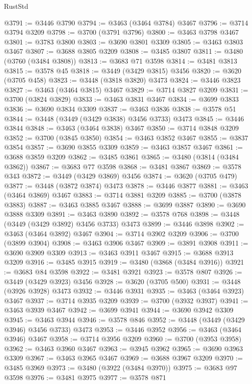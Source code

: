 \begin{lexlean}{RustStd}
\begin{coremodule}
{\begin{coremodule}
{{{{{{{{{{{{{{{{{{{{{{{{{{{{{{{{{{{{{{{{{{{{{{{{{{{{{{{{{{{{{{{{{{{{{{{{{{{{{{{{{{{{{@3791 := @3446 @3790
@3794 := @3463 (@3464 @3784) @3467
@3796 := @3714 @3794 @3209
@3798 := @3700 (@3791 @3796)
@3800 := @3463 @3798 @3467
@3801 := @3783 @3800
@3803 := @3690 @3801 @3309
@3805 := @3463 @3803 @3467
@3807 := @3688 @3805 @3209
@3808 := @3485 @3807
@3811 := @3480 (@3760 (@3484 @3808))
@3813 := @3683 @71 @3598
@3814 := @3481 @3813
@3815 := @3578 @45
@3818 := @3449 (@3429 @3815) @3456
@3820 := @3620 (@3705 @458)
@3823 := @3448 (@3818 @3820) @3473
@3824 := @3446 @3823
@3827 := @3463 (@3464 @3815) @3467
@3829 := @3714 @3827 @3209
@3831 := @3700 (@3824 @3829)
@3833 := @3463 @3831 @3467
@3834 := @3699 @3833
@3836 := @3690 @3834 @3309
@3837 := @3463 @3836
@3838 := @3578 @51
@3844 := @3448 (@3449 (@3429 @3838) @3456 @3733) @3473
@3845 := @3446 @3844
@3848 := @3463 (@3464 @3838) @3467
@3850 := @3714 @3848 @3209
@3852 := @3700 (@3845 @3850)
@3854 := @3463 @3852 @3467
@3855 := @3837 @3854
@3857 := @3690 @3855 @3309
@3859 := @3463 @3857 @3467
@3861 := @3688 @3859 @3209
@3862 := @3485 @3861
@3865 := @3480 (@3814 (@3484 @3862))
@3867 := @3683 @77 @3598
@3868 := @3481 @3867
@3869 := @3578 @343
@3872 := @3449 (@3429 @3869) @3456
@3874 := @3620 (@3705 @479)
@3877 := @3448 (@3872 @3874) @3473
@3878 := @3446 @3877
@3881 := @3463 (@3464 @3869) @3467
@3883 := @3714 @3881 @3209
@3885 := @3700 (@3878 @3883)
@3887 := @3463 @3885 @3467
@3888 := @3699 @3887
@3890 := @3690 @3888 @3309
@3891 := @3463 @3890
@3892 := @3578 @768
@3898 := @3448 (@3449 (@3429 @3892) @3456 @3733) @3473
@3899 := @3446 @3898
@3902 := @3463 (@3464 @3892) @3467
@3904 := @3714 @3902 @3209
@3906 := @3700 (@3899 @3904)
@3908 := @3463 @3906 @3467
@3909 := @3891 @3908
@3911 := @3690 @3909 @3309
@3913 := @3463 @3911 @3467
@3915 := @3688 @3913 @3209
@3916 := @3485 @3915
@3919 := @3480 (@3868 (@3484 @3916))
@3921 := @3683 @84 @3598
@3922 := @3481 @3921
@3923 := @3578 @807
@3926 := @3449 (@3429 @3923) @3456
@3928 := @3620 (@3705 @500)
@3931 := @3448 (@3926 @3928) @3473
@3932 := @3446 @3931
@3935 := @3463 (@3464 @3923) @3467
@3937 := @3714 @3935 @3209
@3939 := @3700 (@3932 @3937)
@3941 := @3463 @3939 @3467
@3942 := @3699 @3941
@3944 := @3690 @3942 @3309
@3945 := @3463 @3944
@3946 := @3578 @846
@3952 := @3448 (@3449 (@3429 @3946) @3456 @3733) @3473
@3953 := @3446 @3952
@3956 := @3463 (@3464 @3946) @3467
@3958 := @3714 @3956 @3209
@3960 := @3700 (@3953 @3958)
@3962 := @3463 @3960 @3467
@3963 := @3945 @3962
@3965 := @3690 @3963 @3309
@3967 := @3463 @3965 @3467
@3969 := @3688 @3967 @3209
@3970 := @3485 @3969
@3973 := @3480 (@3922 (@3484 @3970))
@3975 := @3683 @97 @3598
@3976 := @3481 @3975
@3977 := @3578 @871
}}}}}}}}}}}}}}}}}}}}}}}}}}}}}}}}}}}}}}}}}}}}}}}}}}}}}}}}}}}}}}}}}}}}}}}}}}}}}}}}}}}}}
\end{coremodule}}
\end{coremodule}
\end{lexlean}
